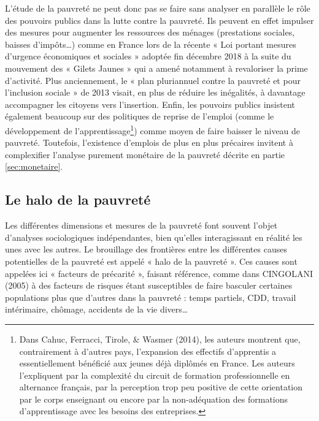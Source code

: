 \documentclass[12pt,a4paper]{reedthesis}
\begin{document}
L'étude de la pauvreté ne peut donc pas se faire sans analyser en parallèle le rôle des pouvoirs publics dans la lutte contre la pauvreté. Ils peuvent en effet impulser des mesures pour augmenter les ressources des ménages (prestations sociales, baisses d'impôts\ldots) comme en France lors de la récente « Loi portant mesures d'urgence économiques et sociales » adoptée fin décembre 2018 à la suite du mouvement des « Gilets Jaunes » qui a amené notamment à revaloriser la prime d'activité. Plus anciennement, le « plan pluriannuel contre la pauvreté et pour l'inclusion sociale » de 2013 visait, en plus de réduire les inégalités, à davantage accompagner les citoyens vers l'insertion. Enfin, les pouvoirs publics insistent également beaucoup sur des politiques de reprise de l'emploi (comme le développement de l'apprentissage\footnote{Dans Cahuc, Ferracci, Tirole, \& Wasmer (2014), les auteurs montrent que, contrairement à d'autres pays, l'expansion des effectifs d'apprentis a essentiellement bénéficié aux jeunes déjà diplômés en France. Les auteurs l'expliquent par la complexité du circuit de formation professionnelle en alternance français, par la perception trop peu positive de cette orientation par le corps enseignant ou encore par la non-adéquation des formations d'apprentissage avec les besoins des entreprises.}) comme moyen de faire baisser le niveau de pauvreté. Toutefois, l'existence d'emplois de plus en plus précaires invitent à complexifier l'analyse purement monétaire de la pauvreté décrite en partie \ref{sec:monetaire}.

\hypertarget{le-halo-de-la-pauvretuxe9}{%
\subsection{Le halo de la pauvreté}\label{le-halo-de-la-pauvretuxe9}}

Les différentes dimensions et mesures de la pauvreté font souvent l'objet d'analyses sociologiques indépendantes, bien qu'elles interagissant en réalité les unes avec les autres. Le brouillage des frontières entre les différentes causes potentielles de la pauvreté est appelé « halo de la pauvreté ». Ces causes sont appelées ici « facteurs de précarité », faisant référence, comme dans CINGOLANI (2005) à des facteurs de risques étant susceptibles de faire basculer certaines populations plus que d'autres dans la pauvreté : temps partiels, CDD, travail intérimaire, chômage, accidents de la vie divers\ldots{}
\end{document}
